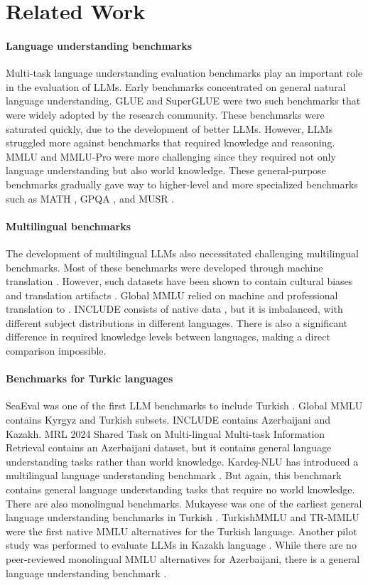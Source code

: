 \section{Related Work}
\paragraph{Language understanding benchmarks}
Multi-task language understanding evaluation benchmarks play an important role in the evaluation of LLMs. Early benchmarks concentrated on general natural language understanding. GLUE \cite{glue} and SuperGLUE \cite{superglue} were two such benchmarks that were widely adopted by the research community. These benchmarks were saturated quickly, due to the development of better LLMs. However, LLMs struggled more against benchmarks that required knowledge and reasoning. MMLU \cite{mmlu} and MMLU-Pro \cite{mmlupro} were more challenging since they required not only language understanding but also world knowledge. These general-purpose benchmarks gradually gave way to higher-level and more specialized benchmarks such as MATH \cite{math}, GPQA \cite{gpqa}, and MUSR \cite{musr}.

\paragraph{Multilingual benchmarks}
The development of multilingual LLMs also necessitated challenging multilingual benchmarks. Most of these benchmarks were developed through machine translation \cite{xnli, globalmmlu}. However, such datasets have been shown to contain cultural biases and translation artifacts \cite{translationese}. Global MMLU relied on machine and professional translation to \cite{globalmmlu}. INCLUDE consists of native data \cite{include}, but it is imbalanced, with different subject distributions in different languages. There is also a significant difference in required knowledge levels between languages, making a direct comparison impossible.

\paragraph{Benchmarks for Turkic languages}
SeaEval was one of the first LLM benchmarks to include Turkish \cite{seaeval}. Global MMLU contains Kyrgyz and Turkish subsets. INCLUDE contains Azerbaijani and Kazakh. MRL 2024 Shared Task on Multi-lingual Multi-task Information Retrieval \cite{mrl2024} contains an Azerbaijani dataset, but it contains general language understanding tasks rather than world knowledge. Kardeş-NLU has introduced a multilingual language understanding benchmark \cite{kardes}. But again, this benchmark contains general language understanding tasks that require no world knowledge. There are also monolingual benchmarks. Mukayese was one of the earliest general language understanding benchmarks in Turkish \cite{mukayese}. TurkishMMLU and TR-MMLU \cite{tr-mmlu} were the first native MMLU alternatives for the Turkish language. Another pilot study was performed to evaluate LLMs in Kazakh language \cite{dollmsspeakkazakh}. While there are no peer-reviewed monolingual MMLU alternatives for Azerbaijani, there is a general language understanding benchmark \cite{allma}.

